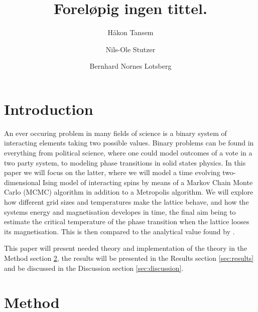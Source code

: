 \documentclass[twocolumn]{aastex62}
\begin{document}
\title{\Large Foreløpig ingen tittel.}

\author{Håkon Tansem}

\author{Nils-Ole Stutzer}

\author{Bernhard Nornes Lotsberg}

\begin{abstract}

\end{abstract}

\section{Introduction} \label{sec:intro}
An ever occuring problem in many fields of science is a binary system of
interacting elements taking two possible values. Binary problems can be found in
everything from political science, where one could model outcomes of a vote in a
two party system, to modeling phase transitions in solid states physics. In this
paper we will focus on the latter, where we will model a time evolving
two-dimensional Ising model of interacting spins by means of a Markov Chain
Monte Carlo (MCMC) algorithm in addition to a Metropolis algorithm. We will explore how
different grid sizes and temperatures make the lattice behave, and how the systems energy and magnetisation
developes in time, the final aim being to estimate the critical temperature of
the phase transition when the lattice looses its magnetisation. This is then
compared to the analytical value found by \cite{onsager:1944}. 

This paper will present needed theory and implementation of the theory in the Method
section \ref{sec:method}, the results will be presented in the Results section
\ref{sec:results} and be discussed in the Discussion section
\ref{sec:discussion}.

\section{Method} \label{sec:method}
\end{document}
